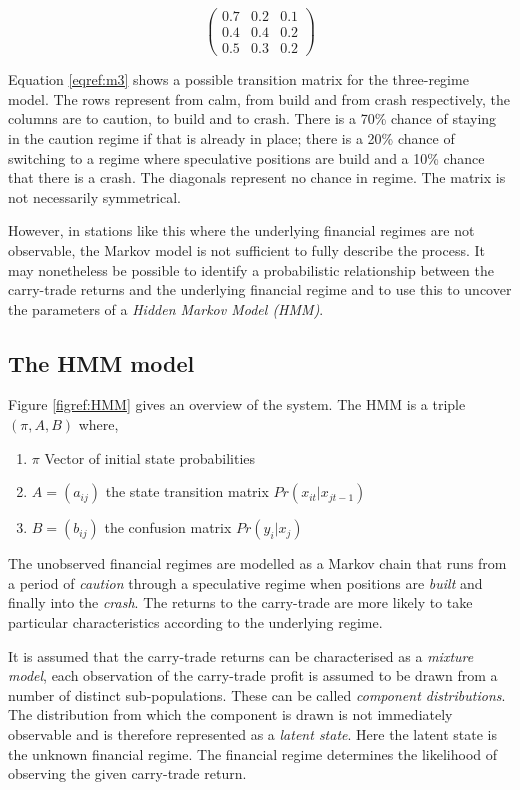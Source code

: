 \documentclass[12pt, a4paper, oneside]{article} %
\begin{document}
\begin{equation}
\label{eqref:m3}
\begin{pmatrix}
0.7 & 0.2 & 0.1\\
0.4 & 0.4 & 0.2\\
0.5 & 0.3 & 0.2
\end{pmatrix}
\end{equation}

Equation \ref{eqref:m3} shows a possible transition matrix for the three-regime model.  The rows represent from calm, from build and from crash respectively, the columns are to caution, to build and to crash.  There is a 70\% chance of staying in the caution regime if that is already in place; there is a 20\% chance of switching to a regime where speculative positions are build and a 10\% chance that there is a crash.  The diagonals represent no chance in regime.  The matrix is not necessarily symmetrical. 

However, in stations like this where the underlying financial regimes are not observable, the Markov model is not sufficient to fully describe the process. It may nonetheless be possible to identify a probabilistic relationship between the carry-trade returns and the underlying financial regime and to use this to uncover the parameters of a \emph{Hidden Markov Model (HMM)}. 
 
\subsection{The HMM model}
Figure \ref{figref:HMM} gives an overview of the system.  The HMM is a triple $(\pi, A, B)$ where,

\begin{enumerate}
\item $\pi$ Vector of initial state probabilities
\item $A = (a_{ij})$ the state transition matrix $Pr(x_{it}|x_{jt-1})$
\item $B = (b_{ij})$ the confusion matrix $Pr(y_i|x_j)$
\end{enumerate}

The unobserved financial regimes are modelled as a Markov chain that runs from a period of \emph{caution} through a speculative regime when positions are \emph{built} and finally into the \emph{crash}.  The returns to the carry-trade are more likely to take particular characteristics according to the underlying regime.   

It is assumed that the carry-trade returns can be characterised as a \emph{mixture model}, each observation of the carry-trade profit is assumed to be drawn from a number of distinct sub-populations.  These can be called \emph{component distributions}.  The distribution from which the component is drawn is not immediately observable and is therefore represented as a \emph{latent state}.  Here the latent state is the unknown financial regime.  The financial regime determines the likelihood of observing the given carry-trade return. 
\end{document}
